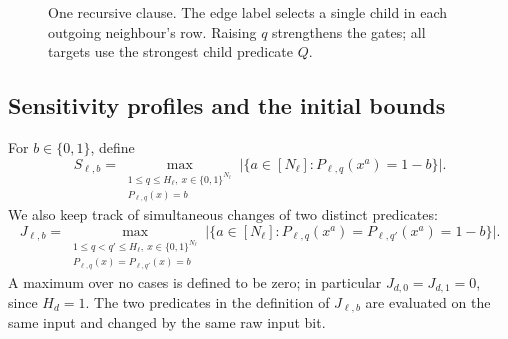 \begin{figure}[htbp]
\centering
{}
\caption{One recursive clause. The edge label selects a single child in
each outgoing neighbour's row. Raising \(q\) strengthens the gates;
all targets use the strongest child predicate \(Q\).}
\label{fig:clause}
\end{figure}

\subsection{Sensitivity profiles and the initial bounds}
For \(b\in\{0,1\}\), define
\[
 S_{\ell,b}=\max_{\substack{1\le q\le H_\ell,\ x\in\{0,1\}^{N_\ell}\\
                           P_{\ell,q}(x)=b}}
 \bigl|\{a\in[N_\ell]:P_{\ell,q}(x^a)=1-b\}\bigr|.
\]
We also keep track of simultaneous changes of two distinct predicates:
\[
 J_{\ell,b}=\max_{\substack{1\le q<q'\le H_\ell,\ x\in\{0,1\}^{N_\ell}\\
                         P_{\ell,q}(x)=P_{\ell,q'}(x)=b}}
 \bigl|\{a\in[N_\ell]:P_{\ell,q}(x^a)=P_{\ell,q'}(x^a)=1-b\}\bigr|.
\]
A maximum over no cases is defined to be zero; in particular
\(J_{d,0}=J_{d,1}=0\), since \(H_d=1\).
The two predicates in the definition of \(J_{\ell,b}\) are evaluated
on the same input and changed by the same raw input bit.

